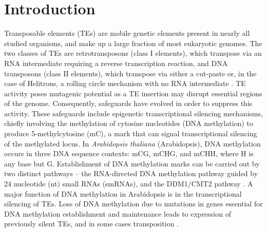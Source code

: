 \documentclass[12pt]{article}
\begin{document}
\pagebreak

\section{Introduction}

Transposable elements (TEs) are mobile genetic elements present in
nearly all studied organisms, and make up a large fraction of most
eukaryotic genomes. The two classes of TEs are retrotransposons (class
I elements), which transpose via an RNA intermediate requiring a
reverse transcription reaction, and DNA transposons (class II
elements), which transpose via either a cut-paste or, in the case of
Helitrons, a rolling circle mechanism with no RNA intermediate
\cite{Wicker:2007en}. TE activity poses mutagenic potential as a TE
insertion may disrupt essential regions of the genome. Consequently,
safeguards have evolved in order to suppress this activity. These
safeguards include epigenetic transcriptional silencing mechanisms,
chiefly involving the methylation of cytosine nucleotides (DNA
methylation) to produce 5-methylcytosine (mC), a mark that can signal
transcriptional silencing of the methylated locus. In
\emph{Arabidopsis thaliana }(Arabidopsis), DNA methylation occurs in
three DNA sequence contexts: mCG, mCHG, and mCHH, where H is any base
but G. Establishment of DNA methylation marks can be carried out by
two distinct pathways -- the RNA-directed DNA methylation pathway
guided by 24 nucleotide (nt) small RNAs (smRNAs), and the DDM1/CMT2
pathway \cite{Zemach:2013dj, Matzke:2014ek}. A major function of DNA
methylation in Arabidopsis is in the transcriptional silencing of TEs.
Loss of DNA methylation due to mutations in genes essential for DNA
methylation establishment and maintenance leads to expression of
previously silent TEs, and in some cases transposition
\cite{Mirouze:2009km, Miura:2001eg, Saze:2003du, Lippman:2004cm,
  Jeddeloh:1999gu, Zemach:2013dj}.
\end{document}
